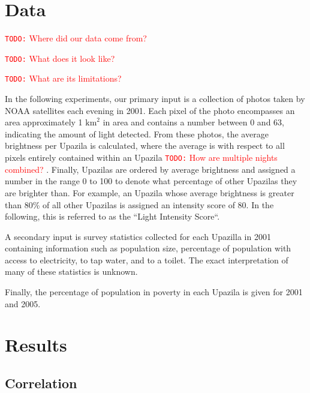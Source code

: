 \documentclass[10pt, letterpaper]{article}
\theoremstyle{plain}
\theoremstyle{definition}
\newcommand{\todo}[1]{
	\textcolor{red}{\texttt{TODO:} #1}
}
\begin{document}
\section{Data}

\todo{Where did our data come from?}

\todo{What does it look like?}

\todo{What are its limitations?}

  In the following experiments, our primary input is a collection of photos taken by NOAA satellites each evening in 2001. Each pixel of the photo encompasses an area approximately 1 $\text{km}^2$ in area and contains a number between 0 and 63, indicating the amount of light detected.  From these photos, the average brightness per Upazila is calculated, where the average is with respect to all pixels entirely contained within an Upazila  \todo{How are multiple nights combined?}. Finally, Upazilas are ordered by average brightness and assigned a number in the range 0 to 100 to denote what percentage of other Upazilas they are brighter than. For example, an Upazila whose average brightness is greater than 80\% of all other Upazilas is assigned an intensity score of 80.  In the following, this is referred to as the ``Light Intensity Score``.
  	
  A secondary input is survey statistics collected for each Upazilla in 2001 containing information such as population size, percentage of population with access to electricity, to tap water, and to a toilet.  The exact interpretation of many of these statistics is unknown.
  
  Finally, the percentage of population in poverty in each Upazila is given for 2001 and 2005.
  
\section{Results}

\subsection{Correlation}
\end{document}
